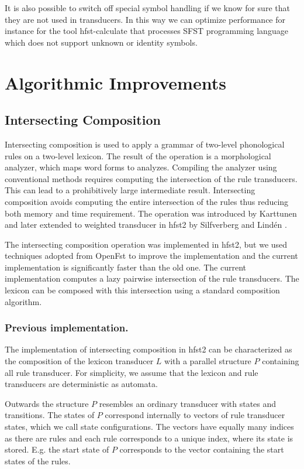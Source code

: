 \documentclass{llncs}
\begin{document}
It is also possible to switch off special symbol handling if we know
for sure that they are not used in transducers. 
In this way we can optimize performance for instance for the tool 
hfst-calculate that processes SFST programming language which does not
support unknown or identity symbols.


\section{Algorithmic Improvements}
\subsection{Intersecting Composition}

Intersecting composition is used to apply a grammar of two-level
phonological rules on a two-level lexicon. The result of the operation
is a morphological analyzer, which maps word forms to
analyzes. Compiling the analyzer using conventional methods requires
computing the intersection of the rule transducers. This can lead to a
prohibitively large intermediate result. Intersecting composition
avoids computing the entire intersection of the rules thus reducing
both memory and time requirement. The operation was introduced by
Karttunen \cite{Karttunen/1994} and later extended to weighted
transducer in hfst2 by Silfverberg and Lind\'{e}n
\cite{silfverberg/2009/2}.

The intersecting composition operation was implemented in hfst2, but
we used techniques adopted from OpenFst \cite{openfst/2007} to improve
the implementation and the current implementation is significantly
faster than the old one. The current implementation computes a lazy
pairwise intersection of the rule transducers. The lexicon can be
composed with this intersection using a standard composition
algorithm.

\subsubsection{Previous implementation.}

The implementation of intersecting composition in hfst2 can be
characterized as the composition of the lexicon transducer $L$ with a
parallel structure $P$ containing all rule transducer. For simplicity,
we assume that the lexicon and rule transducers are deterministic as
automata.

Outwards the structure $P$ resembles an ordinary transducer with
states and transitions. The states of $P$ correspond internally to
vectors of rule transducer states, which we call state
configurations. The vectors have equally many indices as there are rules
and each rule corresponds to a unique index, where its state is
stored. E.g. the start state of $P$ corresponds to the vector
containing the start states of the rules.
\end{document}
